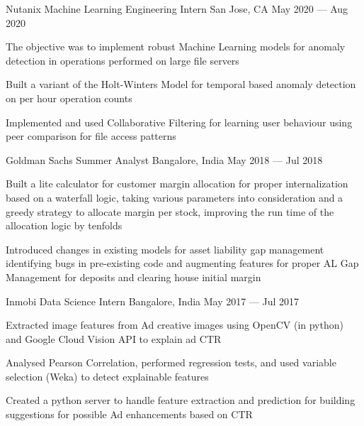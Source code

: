 

\cventry
	{Nutanix}
	{Machine Learning Engineering Intern}
    {San Jose, CA}
	{May 2020 --- Aug 2020}
	{%
		\begin{cvitems}
            \item The objective was to implement robust Machine Learning models for anomaly detection in operations performed on large file servers
            \item Built a variant of the Holt-Winters Model for temporal based anomaly detection on per hour operation counts
            \item Implemented and used Collaborative Filtering for learning user behaviour using peer comparison for file access patterns
		\end{cvitems}
	}
	
\cventry
	{Goldman Sachs}
	{Summer Analyst}
	{Bangalore, India}
	{May 2018 --- Jul 2018}
	{%
		\begin{cvitems}
			\item Built a lite calculator for customer margin allocation for proper internalization based on a waterfall logic, taking various parameters into consideration and a greedy strategy to allocate margin per stock, improving the run time of the allocation logic by tenfolds
			\item Introduced changes in existing models for asset liability gap management identifying bugs in pre-existing code and augmenting features for proper AL Gap Management for deposits and clearing house initial margin
		\end{cvitems}
	}

\cventry
	{Inmobi}
	{Data Science Intern}
	{Bangalore, India}
	{May 2017 --- Jul 2017}
	{%
		\begin{cvitems}
			\item Extracted image features from Ad creative images using OpenCV (in python) and Google Cloud Vision API to explain ad CTR
			\item Analysed Pearson Correlation, performed regression tests, and used variable selection (Weka) to detect explainable features 
			\item Created a python server to handle feature extraction and prediction for building suggestions for possible Ad enhancements based on CTR
		\end{cvitems}
	}

